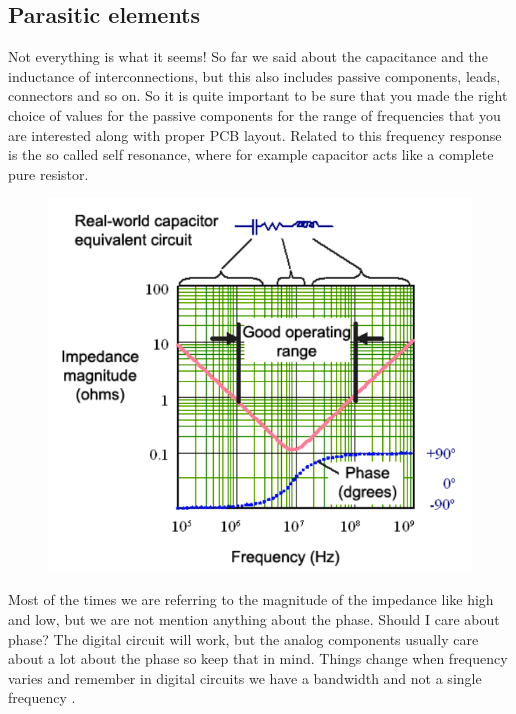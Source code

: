 \documentclass[final]{cubedoc}
\begin{document}
	
	
	\subsection{Parasitic elements}
	
	Not everything is what it seems! So far we said about the capacitance and the inductance of interconnections, but this also includes passive components, leads, connectors and so on. So it is quite important to be sure that you made the right choice of values for the passive components for the range of frequencies that you are interested along with proper PCB layout. Related to this frequency response is the so called self resonance, where for example capacitor acts like a complete pure resistor.
	
	\begin{figure}[h!]
		\centering
		\includegraphics[keepaspectratio, height=.4\textheight, width = \textwidth]{assets/real_cap.png}
		\caption{\cite{sigcon:resonance}}
	\end{figure}
	
	Most of the times we are referring to the magnitude of the impedance like high and low, but we are not mention anything about the phase. Should I care about phase? The digital circuit will work, but the analog components usually care about a lot about the phase so keep that in mind. Things change when frequency varies and remember in digital circuits we have a bandwidth and not a single frequency \cite{sigcon:resonance}. 
	
\end{document}
